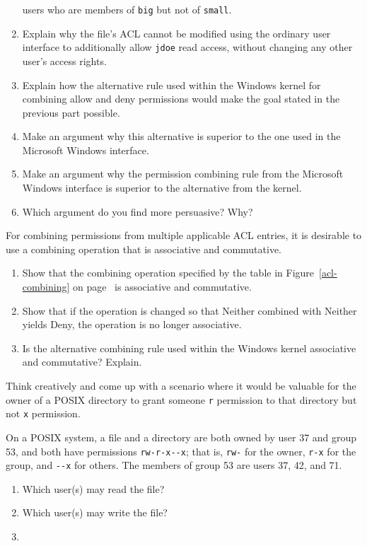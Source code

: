 \begin{chapterEnumerate}
\begin{enumerate}
users who are members of \verb|big| but not of \verb|small|.
\item
Explain why the file's ACL cannot be modified using the ordinary user
interface to additionally allow
\verb|jdoe| read access, without changing any other user's access
rights.
\item
Explain how the alternative rule used within the Windows kernel for combining allow and deny permissions
would make the goal stated in the previous part possible.
\item
Make an argument why this alternative is superior to the one used in
the Microsoft Windows interface.
\item
Make an argument why the permission combining rule from the Microsoft
Windows interface is superior to the alternative from the kernel.
\item
Which argument do you find more persuasive?  Why?
\end{enumerate}
\item
For combining permissions from multiple applicable ACL entries, it is
desirable to use a combining operation that is associative and
commutative.
\begin{enumerate}
\item
Show that the combining operation specified by the table in
Figure~\ref{acl-combining} on page~\pageref{acl-combining} is associative and commutative.
\item
Show that if the operation is changed so that Neither combined with
Neither yields Deny, the operation is no longer associative.
\item
Is the alternative combining rule used within the Windows kernel associative and commutative?  Explain.
\end{enumerate}
\item\label{r-but-not-x-exercise}
Think creatively and come up with a scenario where it would be
valuable for the owner of a POSIX directory to grant someone \texttt{r}
permission to that directory but not \texttt{x} permission.
\item
On a POSIX system, a file and a directory are both owned by user 37 and group 53, and
both have permissions \verb|rw-r-x--x|; that is, \verb|rw-| for the owner, \verb|r-x| for
the group, and \verb|--x| for others.  The members of group 53 are users 37,
42, and 71.
\begin{enumerate}
\item
Which user(s) may read the file?
\item
Which user(s) may write the file?
\item

\end{enumerate}
\end{chapterEnumerate}
